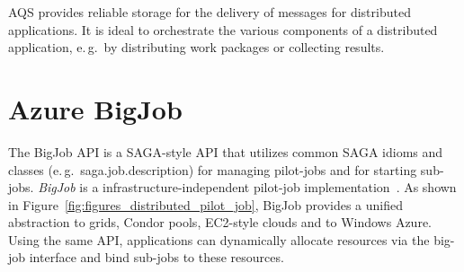 \documentclass[conference,final]{IEEEtran}
\newcommand{\up}{\vspace*{-1em}}
\newcommand{\alnote}[1]{ {\textcolor{blue} { ***AL: #1 }}}
\newcommand{\jhanote}[1]{ {\textcolor{red} { ***SJ: #1 }}}
\newcommand{\alnote}[1]{}
\newcommand{\jhanote}[1]{}
\begin{document}

AQS provides reliable storage for the delivery of messages for
distributed applications.  It is ideal to orchestrate the various
components of a distributed application, e.\,g.\ by distributing work
packages or collecting results.


\up
\section{Azure BigJob}
\label{sec:bigjob-saga}
\up

The BigJob API is a SAGA-style API that utilizes common SAGA idioms
and classes (e.\,g.\ saga.job.description) for managing pilot-jobs and
for starting sub-jobs.  \emph{BigJob} is a infrastructure-independent
pilot-job implementation~\cite{10.1109/CCGRID.2010.91}.  As shown in
Figure~\ref{fig:figures_distributed_pilot_job}, BigJob provides a
unified abstraction to grids, Condor pools, EC2-style clouds and to
Windows Azure. Using the same API, applications can dynamically
allocate resources via the big-job interface and bind sub-jobs to
these resources.
\end{document}
